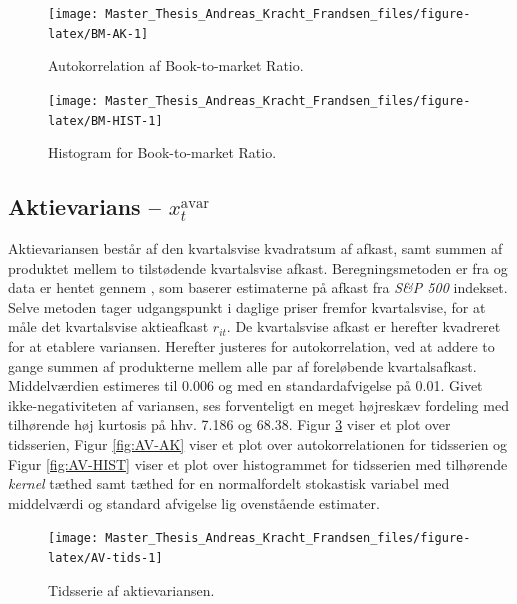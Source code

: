 \documentclass[
  a4paper,
  oneside]{memoir}
\begin{document}
\begin{figure}[H]

{\centering \texttt{[image: Master\_Thesis\_Andreas\_Kracht\_Frandsen\_files/figure-latex/BM-AK-1]} 

}

\caption{Autokorrelation af Book-to-market Ratio.}\label{fig:BM-AK}
\end{figure}

\begin{figure}[H]

{\centering \texttt{[image: Master\_Thesis\_Andreas\_Kracht\_Frandsen\_files/figure-latex/BM-HIST-1]} 

}

\caption{Histogram for Book-to-market Ratio.}\label{fig:BM-HIST}
\end{figure}

\hypertarget{aktievarians-x_ttextavar}{%
\subsection{\texorpdfstring{Aktievarians -- \(x_t^{\text{avar}}\)}{Aktievarians -- x\_t\^{}\{\textbackslash text\{avar\}\}}}\label{aktievarians-x_ttextavar}}

Aktievariansen består af den kvartalsvise kvadratsum af afkast, samt summen af produktet mellem to tilstødende kvartalsvise afkast. Beregningsmetoden er fra \citep{Schwert1987} og data er hentet gennem \citep{Goyal2007}, som baserer estimaterne på afkast fra \emph{S\&P 500} indekset. Selve metoden tager udgangspunkt i daglige priser fremfor kvartalsvise, for at måle det kvartalsvise aktieafkast \(r_{it}\). De kvartalsvise afkast er herefter kvadreret for at etablere variansen. Herefter justeres for autokorrelation, ved at addere to gange summen af produkterne mellem alle par af foreløbende kvartalsafkast. Middelværdien estimeres til 0.006 og med en standardafvigelse på 0.01. Givet ikke-negativiteten af variansen, ses forventeligt en meget højreskæv fordeling med tilhørende høj kurtosis på hhv. 7.186 og 68.38. Figur \ref{fig:AV-tids} viser et plot over tidsserien, Figur \ref{fig:AV-AK} viser et plot over autokorrelationen for tidsserien og Figur \ref{fig:AV-HIST} viser et plot over histogrammet for tidsserien med tilhørende \emph{kernel} tæthed samt tæthed for en normalfordelt stokastisk variabel med middelværdi og standard afvigelse lig ovenstående estimater.

\begin{figure}[H]

{\centering \texttt{[image: Master\_Thesis\_Andreas\_Kracht\_Frandsen\_files/figure-latex/AV-tids-1]} 

}

\caption{Tidsserie af aktievariansen.}\label{fig:AV-tids}
\end{figure}
\end{document}
